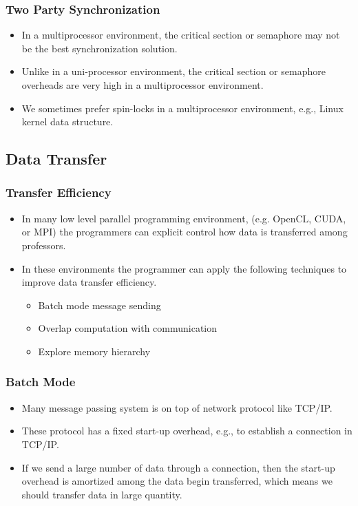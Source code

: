 \documentclass{beamer}
\begin{document}
\begin{CJK}{UTF8}{bsmi}
\begin{frame}
\frametitle{Two Party Synchronization}
\begin{itemize}
\item In a multiprocessor environment, the critical section or semaphore may not be the best synchronization solution.
\item Unlike in a uni-processor environment, the critical section or semaphore overheads are very high in a multiprocessor environment.
\item We sometimes prefer spin-locks in a multiprocessor environment, e.g., Linux kernel data structure.
\end{itemize}
\end{frame}

\subsection{Data Transfer}

\begin{frame}
\frametitle{Transfer Efficiency}
\begin{itemize}
\item In many low level parallel programming environment, (e.g. OpenCL, CUDA, or MPI) the programmers can explicit control how data is transferred among professors.
\item In these environments the programmer can apply the following techniques to improve data transfer efficiency.
\begin{itemize}
\item Batch mode message sending
\item Overlap computation with communication
\item Explore memory hierarchy 
\end{itemize}
\end{itemize}
\end{frame}

\begin{frame}
\frametitle{Batch Mode}
\begin{itemize}
\item Many message passing system is on top of network protocol like TCP/IP.
\item These protocol has a fixed start-up overhead, e.g., to establish a connection in TCP/IP.
\item If we send a large number of data through a connection, then the start-up overhead is amortized among the data begin transferred, which means we should transfer data in large quantity.
\end{itemize}
\end{frame}


\end{CJK}
\end{document}

